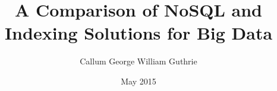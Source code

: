 \documentclass{masterthesis}
\title{A Comparison of NoSQL and Indexing Solutions for Big Data}
\author{Callum George William Guthrie}
\date{May 2015}
\begin{document}
\maketitle
\doublespace
\makefrontmatter





\clearpage


\end{document}
